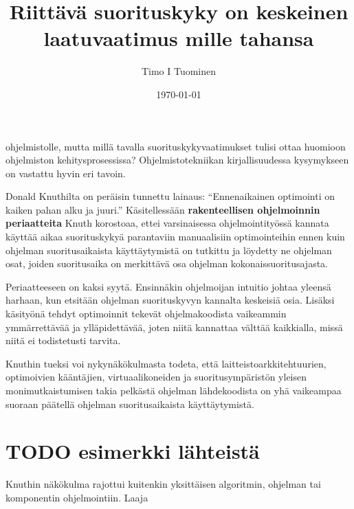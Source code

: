 \documentclass[11pt]{article}
\title{Riittävä suorituskyky on keskeinen laatuvaatimus mille tahansa}
\author{Timo I Tuominen}
\date{\today}
\begin{document}
\maketitle


ohjelmistolle, mutta millä tavalla suorituskykyvaatimukset tulisi
ottaa huomioon ohjelmiston kehitysprosessissa? Ohjelmistotekniikan
kirjallisuudessa kysymykseen on vastattu hyvin eri tavoin.

Donald Knuthilta on peräisin tunnettu lainaus: ``Ennenaikainen
optimointi on kaiken pahan alku ja juuri.''\cite{todo} Käsitellessään \textbf{rakenteellisen ohjelmoinnin periaatteita} Knuth korostoaa, ettei
varsinaisessa ohjelmointityössä kannata käyttää aikaa suorituskykyä
parantaviin manuaalisiin optimointeihin ennen kuin ohjelman
suoritusaikaista käyttäytymistä on tutkittu ja löydetty ne ohjelman
osat, joiden suoritusaika on merkittävä osa ohjelman
kokonaissuoritusajasta.

Periaatteeseen on kaksi syytä. Ensinnäkin ohjelmoijan intuitio johtaa
yleensä harhaan, kun etsitään ohjelman suorituskyvyn kannalta
keskeisiä osia. Lisäksi käsityönä tehdyt optimoinnit tekevät
ohjelmakoodista vaikeammin ymmärrettävää ja ylläpidettävää, joten
niitä kannattaa välttää kaikkialla, missä niitä ei todistetusti
tarvita.

Knuthin tueksi voi nykynäkökulmasta todeta, että
laitteistoarkkitehtuurien, optimoivien kääntäjien, virtuaalikoneiden
ja suoritusympäristön yleisen monimutkaistumisen takia pelkästä
ohjelman lähdekoodista on yhä vaikeampaa suoraan päätellä ohjelman
suoritusaikaista käyttäytymistä.

\section{\textbf{TODO} esimerkki lähteistä}
\label{sec-1}


Knuthin näkökulma rajottui kuitenkin yksittäisen algoritmin, ohjelman
tai komponentin ohjelmointiin. Laaja
\end{document}
